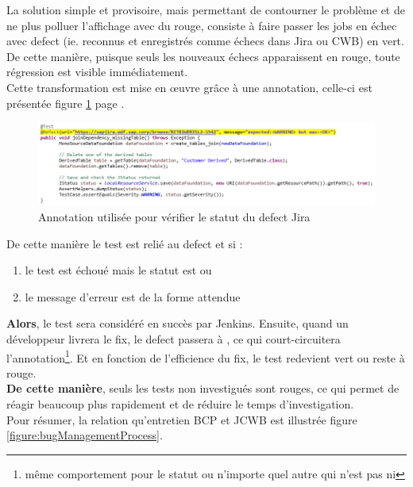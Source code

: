 La solution simple et provisoire, mais permettant de contourner le problème et de ne plus polluer l'affichage avec du rouge, consiste à faire passer les jobs en échec avec defect (ie. reconnus et enregistrés comme échecs dans Jira ou CWB) en vert.\\
De cette manière, puisque seuls les nouveaux échecs apparaissent en rouge, toute régression est visible immédiatement.\\
Cette transformation est mise en \oe{}uvre grâce à une annotation, celle-ci est présentée figure \ref{figure:annotationJava} page \pageref{figure:annotationJava}.\\


\begin{figure}[h]
  \centering
      \includegraphics[width=\textwidth]{images/annotationJava.png}
  \caption{Annotation utilisée pour vérifier le statut du defect Jira}
	\label{figure:annotationJava}
\end{figure}

De cette manière le test est relié au defect et si :
\begin{enumerate}
	\item le test est échoué mais le statut est  ou 
	\item le message d'erreur est de la forme attendue
\end{enumerate}
\textbf{Alors}, le test sera considéré en succès par Jenkins. Ensuite, quand un développeur livrera le fix, le defect passera à , ce qui court-circuitera l'annotation\footnote{même comportement pour le statut  ou n'importe quel autre qui n'est pas  ni }. Et en fonction de l'efficience du fix, le test redevient vert ou reste à rouge.\\
\textbf{De cette manière}, seuls les tests non investigués sont rouges, ce qui permet de réagir beaucoup plus rapidement et de réduire le temps d'investigation.\\

Pour résumer, la relation qu'entretien BCP et JCWB est illustrée figure \ref{figure:bugManagementProcess}.

